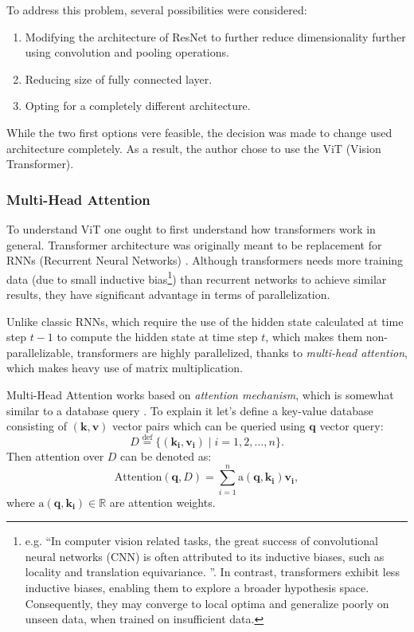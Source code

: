 To address this problem, several possibilities were considered:
\begin{enumerate}
    \item Modifying the architecture of ResNet to further reduce dimensionality further using convolution and pooling operations.
    \item Reducing size of fully connected layer.
    \item Opting for a completely different architecture.
\end{enumerate}

While the two first options vere feasible, the decision was made to change used architecture completely. 
As a result, the author chose to use the ViT (Vision Transformer).

\subsubsection{Multi-Head Attention}
To understand ViT one ought to first understand how transformers work in general.
Transformer architecture was originally meant to be replacement for RNNs (Recurrent Neural Networks) \cite{Vaswani2017}.
Although transformers needs more training data (due to small inductive bias\footnote{e.g. ``In computer vision related tasks, the great success of convolutional neural networks (CNN) is often attributed to its inductive biases, such as locality and translation equivariance. \cite{Mormille2023}''. 
In contrast, transformers exhibit less inductive biases, enabling them to explore a broader hypothesis space. 
Consequently, they may converge to local optima and generalize poorly on unseen data, when trained on insufficient data.}) 
than recurrent networks to achieve similar results, they have significant advantage in terms of parallelization.

Unlike classic RNNs, which require the use of the hidden state calculated at time step $t-1$ to compute the hidden state at time step $t$, which makes them non-parallelizable, transformers are highly parallelized, thanks to \emph{multi-head attention}, which makes heavy use of matrix multiplication.

Multi-Head Attention works based on \emph{attention mechanism}, which is somewhat similar to a database query \cite{d2lAttentionMechanism}.
To explain it let's define a key-value database consisting of $(\mathbf{k}, \textbf{v})$ vector pairs which can be queried using $\mathbf{q}$ vector query: \[ D\overset{\text{def}}{=}\{(\mathbf{k_i}, \mathbf{v_i}) \mid i = 1, 2, \ldots, n\}.\]
Then attention over $D$ can be denoted as:
\[ \text{Attention}(\mathbf{q}, D) = \sum_{i=1}^{n}\text{a}(\mathbf{q}, \mathbf{k_i})\mathbf{v_i},\]
where $\text{a}(\mathbf{q}, \mathbf{k_i}) \in \mathbb{R}$ are attention weights.

